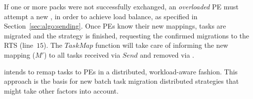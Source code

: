 If one or more packs were not successfully exchanged, an \textit{overloaded} PE must attempt a new \batchsend, in order to achieve load balance, as specified in Section~\ref{sec:algo:sending}.
Once PEs know their new mappings, tasks are migrated and the strategy is finished, requesting the confirmed migrations to the RTS (line~$15$). 
The $TaskMap$ function will take care of informing the new mapping ($M'$) to all tasks received via $Send$ and removed via \batchsend.

\packdrop intends to remap tasks to PEs in a distributed, workload-aware fashion.
This approach is the basis for new batch task migration distributed strategies that might take other factors into account.